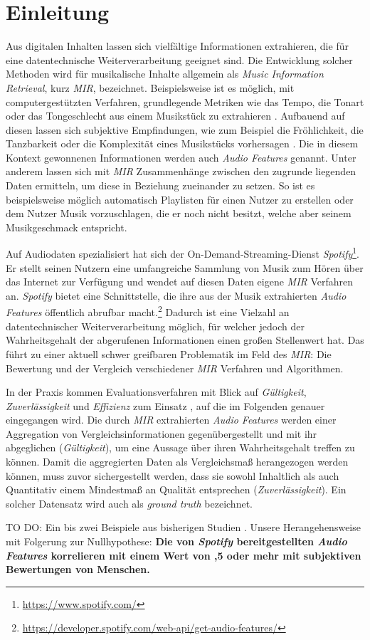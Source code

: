 \section*{Einleitung}
\label{sec:Einleitung}
Aus digitalen Inhalten lassen sich vielfältige Informationen extrahieren, die für eine datentechnische Weiterverarbeitung geeignet sind.
Die Entwicklung solcher Methoden wird für musikalische Inhalte allgemein als \textit{Music Information Retrieval}, kurz \textit{MIR}, bezeichnet.
Beispielsweise ist es möglich, mit computergestützten Verfahren, grundlegende Metriken wie das Tempo, die Tonart oder das Tongeschlecht aus einem Musikstück zu extrahieren \cite{Casey2008}.
Aufbauend auf diesen lassen sich subjektive Empfindungen, wie zum Beispiel die Fröhlichkeit, die Tanzbarkeit oder die Komplexität eines Musikstücks vorhersagen \cite{Sturm2013}.
Die in diesem Kontext gewonnenen Informationen werden auch \textit{Audio Features} genannt.
Unter anderem lassen sich mit \textit{MIR} Zusammenhänge zwischen den zugrunde liegenden Daten ermitteln, um diese in Beziehung zueinander zu setzen.
So ist es beispielsweise möglich automatisch Playlisten für einen Nutzer zu erstellen oder dem Nutzer Musik vorzuschlagen, die er noch nicht besitzt, welche aber seinem Musikgeschmack entspricht. %

Auf Audiodaten spezialisiert hat sich der On-Demand-Streaming-Dienst \textit{Spotify}\footnote{\url{https://www.spotify.com/}}.
Er stellt seinen Nutzern eine umfangreiche Sammlung von Musik zum Hören über das Internet zur Verfügung und wendet auf diesen Daten eigene \textit{MIR} Verfahren an.
\textit{Spotify} bietet eine Schnittstelle, die ihre aus der Musik extrahierten \textit{Audio Features} öffentlich abrufbar macht.\footnote{\url{https://developer.spotify.com/web-api/get-audio-features/}}
Dadurch ist eine Vielzahl an datentechnischer Weiterverarbeitung möglich, für welcher jedoch der Wahrheitsgehalt der abgerufenen Informationen einen großen Stellenwert hat.
Das führt zu einer aktuell schwer greifbaren Problematik im Feld des \textit{MIR}:
Die Bewertung und der Vergleich verschiedener \textit{MIR} Verfahren und Algorithmen.

In der Praxis kommen Evaluationsverfahren mit Blick auf \textit{Gültigkeit}, \textit{Zuverlässigkeit} und \textit{Effizienz} zum Einsatz \cite{Downie2004}, auf die im Folgenden genauer eingegangen wird.
Die durch \textit{MIR} extrahierten \textit{Audio Features} werden einer Aggregation von Vergleichsinformationen gegenübergestellt und mit ihr abgeglichen (\textit{Gültigkeit}), um eine Aussage über ihren Wahrheitsgehalt treffen zu können.
Damit die aggregierten Daten als Vergleichsmaß herangezogen werden können, muss zuvor sichergestellt werden, dass sie sowohl Inhaltlich als auch Quantitativ einem Mindestmaß an Qualität entsprechen (\textit{Zuverlässigkeit}).
Ein solcher Datensatz wird auch als \textit{ground truth} bezeichnet.


TO DO:
Ein bis zwei Beispiele aus bisherigen Studien 
\cite{Urbano_2013}.
Unsere Herangehensweise mit Folgerung zur Nullhypothese:
\textbf{Die von \textit{Spotify} bereitgestellten \textit{Audio Features} korrelieren mit einem Wert von ,5 oder mehr mit subjektiven Bewertungen von Menschen.}
